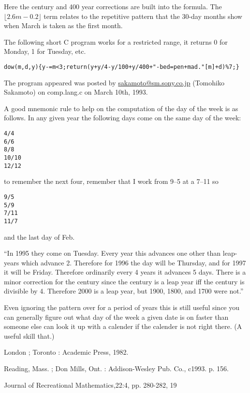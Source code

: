     Here the century and 400 year corrections are built into the formula.
    The $\lfloor 2.6m-0.2\rfloor$ term relates to the repetitive pattern that the 30-day
    months show when March is taken as the first month.

The following short C program works for a restricted range, it returns 0 for
Monday, 1 for Tuesday, etc.

\begin{verbatim}
dow(m,d,y){y-=m<3;return(y+y/4-y/100+y/400+"-bed=pen+mad."[m]+d)%7;}
\end{verbatim}

The program appeared  was posted by
\url{sakamoto@sm.sony.co.jp} (Tomohiko Sakamoto) on comp.lang.c on March
10th, 1993.

A good mnemonic rule to help on the computation of the day of the week is
as follows. In any given year the following days come on
the same day of the week:

\begin{verbatim}
4/4
6/6
8/8
10/10
12/12
\end{verbatim}

\noindent to remember the next four, remember that I work from 9--5 at a 7--11 so

\begin{verbatim}
9/5
5/9
7/11
11/7
\end{verbatim}

\noindent and the last day of Feb.

``In 1995 they come on Tuesday. Every year this advances one other than
leap-years which advance 2. Therefore for 1996 the day will be
Thursday, and for 1997 it will be Friday. Therefore ordinarily every 4
years it advances 5 days. There is a minor correction for the century
since the century is a leap year iff the century is divisible by 4.
Therefore 2000 is a leap year, but 1900, 1800, and 1700 were not.''

Even ignoring the pattern over for a period of years this is still
useful since you can generally figure out what day of the week a given
date is on faster than someone else can look it up with a calender if
the calender is not right there. (A useful skill that.)


    \Ref

    {London ; Toronto : Academic Press, 1982.}


    {Reading, Mass. ; Don Mills, Ont. : Addison-Wesley Pub. Co., c1993. p. 156.}


    {Journal of Recreational Mathematics,}{22:4, pp. 280-282, 19}
